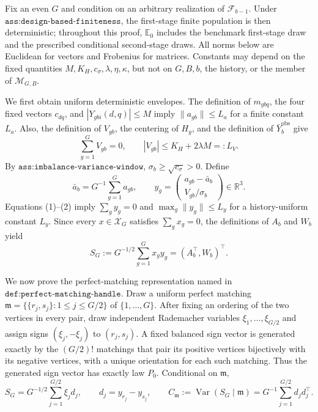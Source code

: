 Fix an even \(G\) and condition on an arbitrary realization of \(\mathcal F_{b-1}\).  Under \(\texttt{ass:design-based-finiteness}\), the first-stage finite population is then deterministic; throughout this proof, \(\mathbb E_0\) includes the benchmark first-stage draw and the prescribed conditional second-stage draws.  All norms below are Euclidean for vectors and Frobenius for matrices.  Constants may depend on the fixed quantities \(M,K_H,c_\sigma,\lambda,\eta,\kappa\), but not on \(G,B,b\), the history, or the member of \(\mathcal M_{G,B}\).

We first obtain uniform deterministic envelopes.  The definition of \(m_{gbq}\), the four fixed vectors \(c_{dq}\), and \(|Y_{gbi}(d,q)|\leq M\) imply \(\|a_{gb}\|\leq L_a\) for a finite constant \(L_a\).  Also, the definition of \(V_{gb}\), the centering of \(H_g\), and the definition of \(\bar Y_b^{\mathrm{obs}}\) give
\[
 \sum_{g=1}^G V_{gb}=0,
 \qquad
 |V_{gb}|\leq K_H+2\lambda M=:L_V.                                      \tag{1}
\]
By \(\texttt{ass:imbalance-variance-window}\), \(\sigma_b\geq\sqrt{c_\sigma}>0\).  Define
\[
 \bar a_b=G^{-1}\sum_{g=1}^G a_{gb},
 \qquad
 y_g=\begin{pmatrix}a_{gb}-\bar a_b\\ V_{gb}/\sigma_b\end{pmatrix}
 \in\mathbb R^3.                                                         \tag{2}
\]
Equations (1)--(2) imply \(\sum_g y_g=0\) and \(\max_g\|y_g\|\leq L_y\) for a history-uniform constant \(L_y\).  Since every \(x\in\mathcal X_G\) satisfies \(\sum_gx_g=0\), the definitions of \(A_b\) and \(W_b\) yield
\[
 S_G:=G^{-1/2}\sum_{g=1}^Gx_gy_g=(A_b^\top,W_b)^\top.                    \tag{3}
\]

We now prove the perfect-matching representation named in \(\texttt{def:perfect-matching-handle}\).  Draw a uniform perfect matching
\(
 \mathfrak m=\{\{r_j,s_j\}:1\leq j\leq G/2\}
\)
of \(\{1,\ldots,G\}\).  After fixing an ordering of the two vertices in every pair, draw independent Rademacher variables \(\xi_1,\ldots,\xi_{G/2}\) and assign signs \((\xi_j,-\xi_j)\) to \((r_j,s_j)\).  A fixed balanced sign vector is generated exactly by the \((G/2)!\) matchings that pair its positive vertices bijectively with its negative vertices, with a unique orientation for each such matching.  Thus the generated sign vector has exactly law \(P_0\).  Conditional on \(\mathfrak m\),
\[
 S_G=G^{-1/2}\sum_{j=1}^{G/2}\xi_jd_j,
 \qquad
 d_j=y_{r_j}-y_{s_j},
 \qquad
 C_{\mathfrak m}:=\operatorname{Var}(S_G\mid\mathfrak m)
     =G^{-1}\sum_{j=1}^{G/2}d_jd_j^\top.                                 \tag{4}
\]

